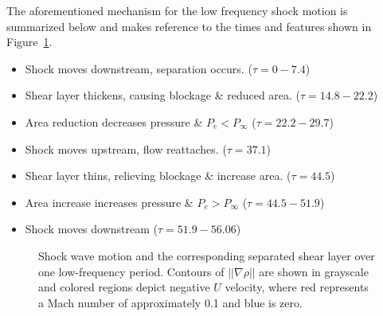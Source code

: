 \documentclass[]{aiaa-tc}%
\begin{document}
The aforementioned mechanism for the low frequency shock motion is summarized below and makes reference to the times and features shown in Figure~\ref{fig:history}.
\begin{itemize}
	\item Shock moves downstream, separation occurs. ($\tau=0-7.4$)
	\item Shear layer thickens, causing blockage \& reduced area. ($\tau=14.8-22.2$)
	\item Area reduction decreases pressure \& $P_e < P_{\infty}$ ($\tau=22.2-29.7$)
	\item Shock moves upstream, flow reattaches. ($\tau=37.1$)
	\item Shear layer thins, relieving blockage \& increase area. ($\tau=44.5$)
	\item Area increase increases pressure \& $P_e > P_{\infty}$ ($\tau=44.5-51.9$)
	\item Shock moves downstream ($\tau=51.9-56.06$)
\end{itemize}

\begin{figure}[!ht]
  \centering
  
  
  \hspace{0.1in}	            
  \hspace{0.1in}	
  
  \vspace{-.1in}
  
  \hspace{0.1in}	            
  \hspace{0.1in}	
  
  \vspace{-.1in}
  
  \hspace{0.1in}	            
  \hspace{0.1in}	
  
  \caption{Shock wave motion and the corresponding separated shear layer over one low-frequency period.  Contours of $||\nabla\rho||$ are shown in grayscale and colored regions depict negative $U$ velocity, where red represents a Mach number of approximately 0.1 and blue is zero.   }
  
  \label{fig:history}
\end{figure}
\end{document}
